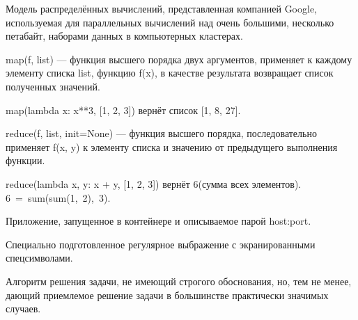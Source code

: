 \begin{definition}[MapReduce]
  Модель распределённых вычислений, представленная
  компанией Google, используемая для параллельных вычислений над очень
  большими, несколько петабайт, наборами данных в компьютерных кластерах.
\end{definition}

\begin{definition}[Map]
  map(f, list) --- функция высшего порядка двух аргументов, применяет к каждому
  элементу списка list, функцию f(x), в качестве результата возвращает список
  полученных значений.
\end{definition}

\begin{example}
  map(lambda x: x**3, [1, 2, 3]) вернёт список [1, 8, 27].
\end{example}

\begin{definition}[Reduce]
  reduce(f, list, init=None) --- функция высшего порядка, последовательно
  применяет f(x, y) к элементу списка и значению от предыдущего выполнения
  функции.
\end{definition}

\begin{example}
  reduce(lambda x, y: x + y, [1, 2, 3]) вернёт 6(сумма всех элементов).
  6~=~sum(sum(1,~2),~3).
\end{example}

\begin{definition}[Экземпляр]
  Приложение, запущенное в контейнере и описываемое парой host:port.
\end{definition}

\begin{definition}[Шаблон]
  Специально подготовленное регулярное выбражение с экранированными
  спецсимволами.
\end{definition}

\begin{definition}
  Алгоритм решения задачи, не имеющий строгого обоснования, но, тем не менее,
  дающий приемлемое решение задачи в большинстве практически значимых случаев.
\end{definition}

